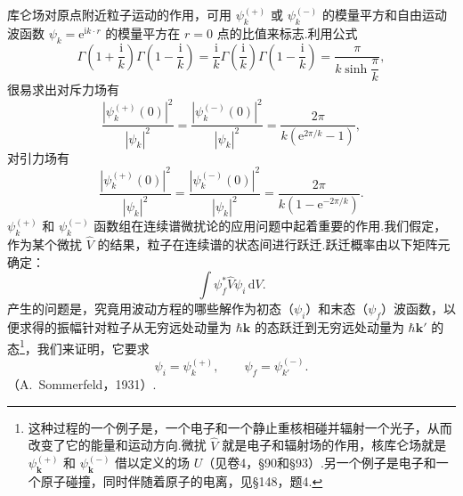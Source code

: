 库仑场对原点附近粒子运动的作用，可用 $\psi_{k}^{(+)}$ 或 $\psi_{k}^{(-)}$ 的模量平方和自由运动波函数 $\psi_k=\mathrm{e}^{\mathrm{i}k\cdot r}$ 的模量平方在 $r=0$ 点的比值来标志.利用公式
\begin{equation*}
  \Gamma\left(1+\frac{\mathrm{i}}{k}\right)
  \Gamma\left(1-\frac{\mathrm{i}}{k}\right)
  =\frac{\mathrm{i}}{k}\Gamma\left(\frac{\mathrm{i}}{k}\right)
  \Gamma\left(1-\frac{\mathrm{i}}{k}\right)
  =\frac{\pi}{k\sinh\dfrac{\pi}{k}},
\end{equation*}
很易求出对斥力场有
\begin{equation}
  \frac{|\psi_{k}^{(+)}(0)|^2}{|\psi_k|^2}
  =\frac{|\psi_{k}^{(-)}(0)|^2}{|\psi_k|^2}
  =\frac{2\pi}{k\left(\mathrm{e}^{2\pi/k}-1\right)},
\end{equation}
对引力场有
\begin{equation}
  \frac{|\psi_{k}^{(+)}(0)|^2}{|\psi_k|^2}
  =\frac{|\psi_{k}^{(-)}(0)|^2}{|\psi_k|^2}
  =\frac{2\pi}{k\left(1-\mathrm{e}^{-2\pi/k}\right)}.
\end{equation}
$\psi_{k}^{(+)}$ 和 $\psi_{k}^{(-)}$ 函数组在连续谱微扰论的应用问题中起着重要的作用.我们假定，作为某个微扰 $\hat{V}$ 的结果，粒子在连续谱的状态间进行跃迁.跃迁概率由以下矩阵元确定：
\begin{equation}
  \int\psi_{f}^{*}\hat{V}\psi_{i}\,\mathrm{d}V.
\end{equation}
产生的问题是，究竟用波动方程的哪些解作为初态（$\psi_i$）和末态（$\psi_f$）波函数，以便求得的振幅针对粒子从无穷远处动量为 $\hbar\boldsymbol{k}$ 的态跃迁到无穷远处动量为 $\hbar\boldsymbol{k}'$ 的态\footnote{这种过程的一个例子是，一个电子和一个静止重核相碰并辐射一个光子，从而改变了它的能量和运动方向.微扰 $\hat{V}$ 就是电子和辐射场的作用，核库仑场就是 $\psi_{\boldsymbol{k}}^{(+)}$ 和 $\psi_{\boldsymbol{k}}^{(-)}$ 借以定义的场 $U$（见卷4，§90和§93）.另一个例子是电子和一个原子碰撞，同时伴随着原子的电离，见§148，题4.}，我们来证明，它要求
\begin{equation}
  \psi_i=\psi_{k}^{(+)},\qquad
  \psi_f=\psi_{k'}^{(-)}.
\end{equation}
（A.~Sommerfeld，1931）.

